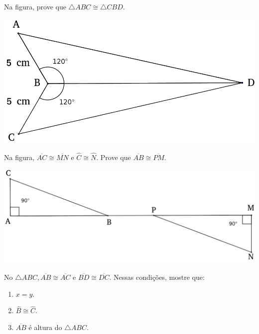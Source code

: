 		 		\item Na figura, prove que $\bigtriangleup ABC \cong \bigtriangleup CBD.$
		 		\begin{center}
		 		\includegraphics[scale=0.4]{figuras/fig19.png} 
		 		\end{center}
		 		
		 		\item Na figura, $\overline{AC} \cong \overline{MN}$ e $\widehat{C} \cong \widehat{N}$. Prove que $\overline{AB} \cong \overline{PM}$.
		 		\begin{center}
		 		\includegraphics[scale=0.4]{figuras/fig20.png}
		 		\end{center}
		 		
		 		\item No $\bigtriangleup ABC, \overline{AB} \cong \overline{AC}$ e $\overline{BD} \cong \overline{DC}$. Nessas condições, mostre que:
		 		\begin{multicols}{3}
		 		\begin{enumerate}
		 			\item $x=y$.
		 			\item $\widehat{B} \cong \widehat{C}$.
		 			\item $\overline{AB}$ é altura do $\bigtriangleup ABC$.
		 		\end{enumerate}
		 		\end{multicols}
		 		
